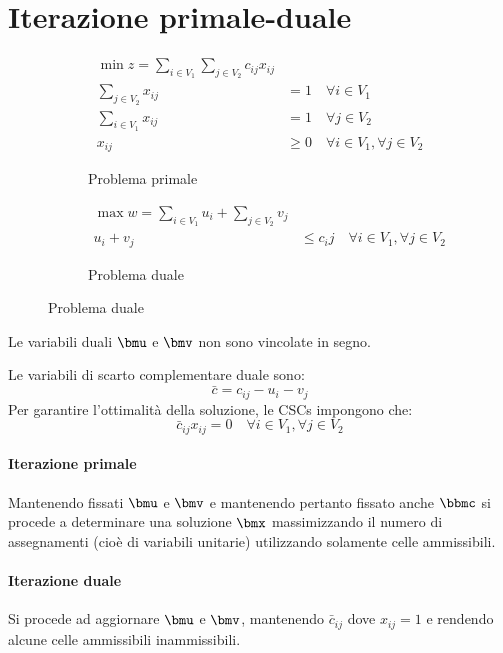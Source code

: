 \documentclass[\main/main.tex]{subfiles}
\begin{document}
\section{Iterazione primale-duale}
\begin{figure}
	\begin{subfigure}{0.49\textwidth}
		\begin{align*}
			\min z = \sum_{i \in V_1} \sum_{j \in V_2} c_{ij}x_{ij}                    \\
			\sum_{j \in V_2}x_{ij} & = 1 \quad \forall i \in V_1                       \\
			\sum_{i \in V_1}x_{ij} & = 1 \quad \forall j \in V_2                       \\
			x_{ij}                 & \geq 0 \quad \forall i \in V_1, \forall j \in V_2
		\end{align*}
		\caption{Problema primale}
	\end{subfigure}
	\begin{subfigure}{0.49\textwidth}
		\begin{align*}
			\max w = \sum_{i\in V_1} u_i + \sum_{j \in V_2} v_j             \\
			u_i + v_j & \leq c_ij\quad \forall i \in V_1, \forall j \in V_2
		\end{align*}
		\caption{Problema duale}
	\end{subfigure}
\end{figure}
Le variabili duali \(\bmu \) e \(\bmv \) non sono vincolate in segno.

Le variabili di scarto complementare duale sono:
\[
	\bar{c} = c_{ij} - u_i - v_j
\]
Per garantire l'ottimalità della soluzione, le CSCs impongono che:
\[
	\bar{c}_{ij}x_{ij} = 0 \quad \forall i \in V_1, \forall j \in V_2
\]

\paragraph*{Iterazione primale} Mantenendo fissati \(\bmu \) e \(\bmv \) e mantenendo pertanto fissato anche \(\bbmc \) si procede a determinare una soluzione \(\bmx \) massimizzando il numero di assegnamenti (cioè di variabili unitarie) utilizzando solamente celle ammissibili.
\paragraph*{Iterazione duale} Si procede ad aggiornare \(\bmu \) e \(\bmv \), mantenendo \(\bar{c}_{ij}\) dove \(x_{ij} = 1\) e rendendo alcune celle ammissibili inammissibili.
\end{document}

